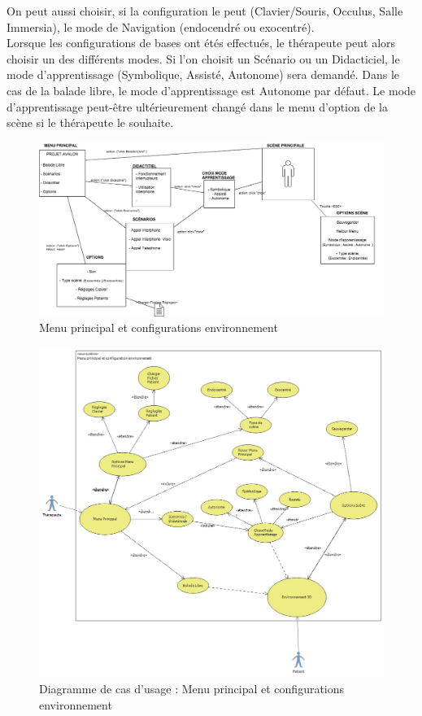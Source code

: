 On peut aussi choisir, si la configuration le peut (Clavier/Souris, Occulus, Salle Immersia), le mode de Navigation (endocendré ou exocentré). 
\\
Lorsque les configurations de bases ont étés effectués, le thérapeute peut alors choisir un des différents modes. Si l'on choisit un Scénario ou un Didacticiel, le mode d'apprentissage (Symbolique, Assisté, Autonome) sera demandé. Dans le cas de la balade libre, le mode d'apprentissage est Autonome par défaut. Le mode d'apprentissage peut-être ultérieurement changé dans le menu d'option de la scène si le thérapeute le souhaite. 
\\

\begin{figure}[h]
\centering
\includegraphics[width=1\textwidth]{2-Specifications/img-utilisateur/menu.png}
\caption{\label{fig:Menu} Menu principal et configurations environnement }
\end{figure}
\begin{figure}[h]
\centering
\includegraphics[width=1\textwidth]{2-Specifications/img-utilisateur/cas-usage-menu.png}
\caption{\label{fig:CasUsageMenu} Diagramme de cas d'usage : Menu principal et configurations environnement }
\end{figure}
\FloatBarrier 



